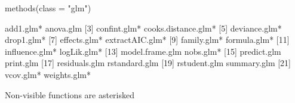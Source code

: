 \begin{Schunk}
\begin{Sinput}
 methods(class = "glm")
\end{Sinput}
\begin{Soutput}
 [1] add1.glm*           anova.glm          
 [3] confint.glm*        cooks.distance.glm*
 [5] deviance.glm*       drop1.glm*         
 [7] effects.glm*        extractAIC.glm*    
 [9] family.glm*         formula.glm*       
[11] influence.glm*      logLik.glm*        
[13] model.frame.glm     nobs.glm*          
[15] predict.glm         print.glm          
[17] residuals.glm       rstandard.glm      
[19] rstudent.glm        summary.glm        
[21] vcov.glm*           weights.glm*       

   Non-visible functions are asterisked
\end{Soutput}
\end{Schunk}
